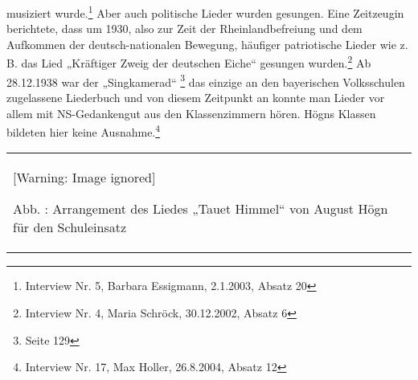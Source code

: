 \documentclass[a4paper]{article}
\newcounter{Abb}
\renewcommand\theAbb{\arabic{Abb}}
\begin{document}
musiziert wurde.\footnote{ Interview Nr. 5, Barbara Essigmann,
2.1.2003, Absatz 20} Aber auch politische Lieder wurden gesungen. Eine
Zeitzeugin berichtete, dass um 1930, also zur Zeit der
Rheinlandbefreiung und dem Aufkommen der deutsch-nationalen Bewegung,
häufiger patriotische Lieder wie z. B. das Lied „Kräftiger Zweig der
deutschen Eiche“ gesungen wurden.\footnote{ Interview Nr. 4, Maria
Schröck, 30.12.2002, Absatz 6} Ab 28.12.1938 war der „Singkamerad“
\footnote{ Seite 129} das einzige an den bayerischen Volksschulen
zugelassene Liederbuch und von diesem Zeitpunkt an konnte man Lieder
vor allem mit NS-Gedankengut aus den Klassenzimmern hören. Högns
Klassen bildeten hier keine Ausnahme.\footnote{ Interview Nr. 17, Max
Holler, 26.8.2004, Absatz 12}

\begin{center}
\begin{minipage}{8.807cm}
\begin{flushleft}
\tablefirsthead{}
\tablehead{}
\tabletail{}
\tablelasttail{}
\begin{supertabular}{m{8.607cm}}
  [Warning: Image ignored] %
 
Abb. \stepcounter{Abb}{\theAbb}: Arrangement des Liedes „Tauet Himmel“
von August Högn für den Schuleinsatz\\
\end{supertabular}
\end{flushleft}
\end{minipage}
\end{center}
\end{document}
